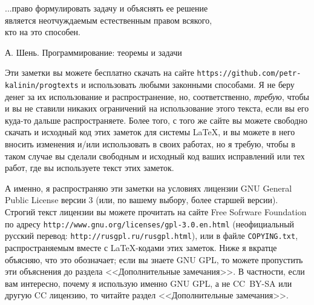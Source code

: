 

\small

\epigraph{...право формулировать задачу и объяснять ее решение\\ является неотчуждаемым естественным правом всякого,\\ кто на это способен.}{А. Шень. Программирование: теоремы и задачи}

Эти заметки вы можете бесплатно скачать на сайте \verb`https://github.com/petr-kalinin/progtexts` и использовать любыми законными способами. Я не беру денег за их использование и распространение, но, соответственно, \textit{требую}, чтобы и вы не ставили никаких ограничений на использование этого текста, если вы его куда-то дальше распространяете. Более того, с того же сайте вы можете свободно скачать и исходный код этих заметок для системы \LaTeX, и вы можете в него вносить изменения и/или использовать в своих работах, но я требую, чтобы в таком случае вы сделали свободным и исходный код ваших исправлений или тех работ, где вы используете текст этих заметок.

А именно, я распространяю эти заметки на условиях лицензии GNU General Public License версии 3 (или, по вашему выбору, более старшей версии). Строгий текст лицензии вы можете прочитать на сайте Free Sofrware Foundation по адресу \verb`http://www.gnu.org/licenses/gpl-3.0.en.html` (неофициальный русский перевод: \verb`http://rus`\-\verb`gpl.ru/rusgpl.html`), или в файле \verb`COPYING.txt`, распространяемым вместе с \LaTeX-кодами этих заметок. Ниже я вкратце объясняю, что это обозначает; если вы знаете GNU GPL, то можете пропустить эти объяснения до раздела <<Дополнительные замечания>>. В частности, если вам интересно, почему я использую именно GNU GPL, а не CC~BY-SA или другую CC лицензию, то читайте раздел <<Дополнительные замечания>>.

